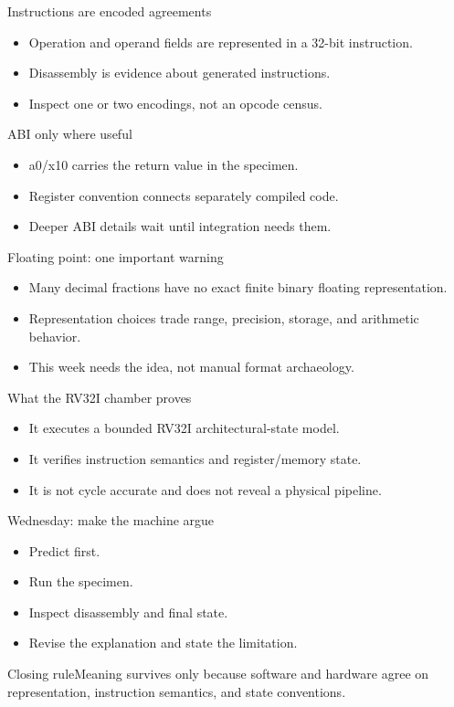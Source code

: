 \documentclass{beamer}
\begin{document}
\begin{frame}{Instructions are encoded agreements}\begin{itemize}\item Operation and operand fields are represented in a 32-bit instruction.\item Disassembly is evidence about generated instructions.\item Inspect one or two encodings, not an opcode census.\end{itemize}\end{frame}
\begin{frame}{ABI only where useful}\begin{itemize}\item a0/x10 carries the return value in the specimen.\item Register convention connects separately compiled code.\item Deeper ABI details wait until integration needs them.\end{itemize}\end{frame}
\begin{frame}{Floating point: one important warning}\begin{itemize}\item Many decimal fractions have no exact finite binary floating representation.\item Representation choices trade range, precision, storage, and arithmetic behavior.\item This week needs the idea, not manual format archaeology.\end{itemize}\end{frame}
\begin{frame}{What the RV32I chamber proves}\begin{itemize}\item It executes a bounded RV32I architectural-state model.\item It verifies instruction semantics and register/memory state.\item It is not cycle accurate and does not reveal a physical pipeline.\end{itemize}\end{frame}
\begin{frame}{Wednesday: make the machine argue}\begin{itemize}\item Predict first.\item Run the specimen.\item Inspect disassembly and final state.\item Revise the explanation and state the limitation.\end{itemize}\end{frame}
\begin{frame}{Closing rule}\centering\Large Meaning survives only because software and hardware agree on representation, instruction semantics, and state conventions.\end{frame}
\end{document}
